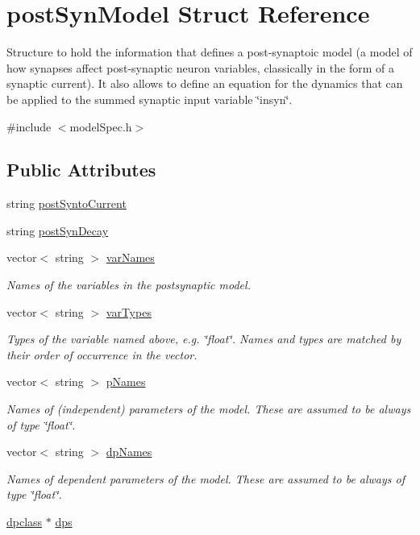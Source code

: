 \hypertarget{structpostSynModel}{\section{post\+Syn\+Model Struct Reference}
\label{structpostSynModel}
}


Structure to hold the information that defines a post-\/synaptoic model (a model of how synapses affect post-\/synaptic neuron variables, classically in the form of a synaptic current). It also allows to define an equation for the dynamics that can be applied to the summed synaptic input variable \char`\"{}insyn\char`\"{}.  




{\ttfamily \#include $<$model\+Spec.\+h$>$}

\subsection*{Public Attributes}
\begin{DoxyCompactItemize}
\item 
string \hyperlink{structpostSynModel_a205249bc6ac27c021d3395a9cad6a81b}{post\+Synto\+Current}
\item 
string \hyperlink{structpostSynModel_a6fe67c6dc9d43b39e17930e61cbffeb0}{post\+Syn\+Decay}
\item 
vector$<$ string $>$ \hyperlink{structpostSynModel_a3ade04dd55a74c018cb3c3c16a0c4a47}{var\+Names}
\begin{DoxyCompactList}\small\item\em Names of the variables in the postsynaptic model. \end{DoxyCompactList}\item 
vector$<$ string $>$ \hyperlink{structpostSynModel_a5afb775c8211cb7591bb3c50526267fc}{var\+Types}
\begin{DoxyCompactList}\small\item\em Types of the variable named above, e.\+g. \char`\"{}float\char`\"{}. Names and types are matched by their order of occurrence in the vector. \end{DoxyCompactList}\item 
vector$<$ string $>$ \hyperlink{structpostSynModel_ae34333d8fa06e35cb7595a1228cc76ca}{p\+Names}
\begin{DoxyCompactList}\small\item\em Names of (independent) parameters of the model. These are assumed to be always of type \char`\"{}float\char`\"{}. \end{DoxyCompactList}\item 
vector$<$ string $>$ \hyperlink{structpostSynModel_a1deddbf488ffa49ec90f084791d9ebe3}{dp\+Names}
\begin{DoxyCompactList}\small\item\em Names of dependent parameters of the model. These are assumed to be always of type \char`\"{}float\char`\"{}. \end{DoxyCompactList}\item 
\hyperlink{classdpclass}{dpclass} $\ast$ \hyperlink{structpostSynModel_a5c0093ffd554c603c21cce0c1b440373}{dps}
\end{DoxyCompactItemize}


